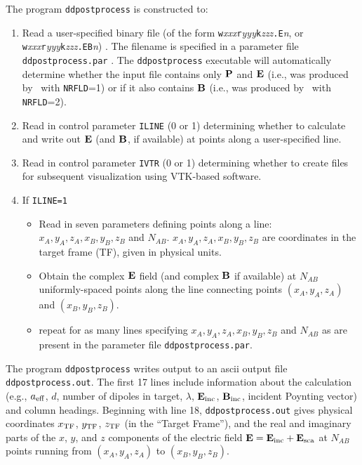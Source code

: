 \medskip
The program {\tt ddpostprocess} is constructed to:
\begin{enumerate}

\item Read a user-specified
binary file (of the form 
{\tt w}{\it xxx}{\tt r}{\it yyy}{\tt k}{\it zzz}{\tt .E}{\it n}, or
{\tt w}{\it xxx}{\tt r}{\it yyy}{\tt k}{\it zzz}{\tt .EB}{\it n}) .
The filename is specified in a parameter file
{\tt ddpostprocess.par} . 
The {\tt ddpostprocess} executable 
will automatically determine whether the input file
contains only ${\bf P}$ and ${\bf E}$ (i.e., was produced by \ddscatv\
with {\tt NRFLD}=1) or if it also contains ${\bf B}$ (i.e., was produced
by \ddscatv\ with {\tt NRFLD}=2).

\item Read in control parameter {\tt ILINE} (0 or 1) determining whether
to calculate and write out ${\bf E}$ (and ${\bf B}$, if available)
at points along a user-specified line.

\item Read in control parameter {\tt IVTR} (0 or 1) determining whether to
create files for subsequent visualization using VTK-based software.

\item If {\tt ILINE=1}
   \begin{itemize}
   \item Read in seven parameters defining points along a line:
   $x_A,y_A,z_A,x_B,y_B,z_B$ and $N_{AB}$.
   $x_A,y_A,z_A,x_B,y_B,z_B$ are coordinates in the target frame (TF),
   given in physical units.

   \item Obtain the complex ${\bf E}$ field (and complex ${\bf B}$ if available)
   at $N_{AB}$ uniformly-spaced points
   along the line connecting points $(x_A,y_A,z_A)$  and $(x_B,y_B,z_B)$.

   \item repeat for as many lines specifying 
   $x_A,y_A,z_A,x_B,y_B,z_B$ and $N_{AB}$
   as are present in the parameter file {\tt ddpostprocess.par}.
   \end{itemize}
\end{enumerate}

The program {\tt ddpostprocess} writes output to an ascii output file
{\tt ddpostprocess.out}.  The first 17 lines include information about the
calculation (e.g., ${a}_{\rm eff}$, $d$, number of dipoles in target,
$\lambda$, ${\bf E}_{\rm inc}$, ${\bf B}_{\rm inc}$, incident Poynting vector) 
and column headings.
Beginning with line 18, {\tt ddpostprocess.out} gives 
physical coordinates $x_{\rm TF}$, $y_{\rm TF}$, $z_{\rm TF}$ 
(in the ``Target Frame''), and the real and imaginary
parts of the $x$, $y$, and $z$ components of the electric field
${\bf E}={\bf E}_{\rm inc}+{\bf E}_{\rm sca}$ at $N_{AB}$ points running from
$(x_A,y_A,z_A)$ to $(x_B,y_B,z_B)$.

